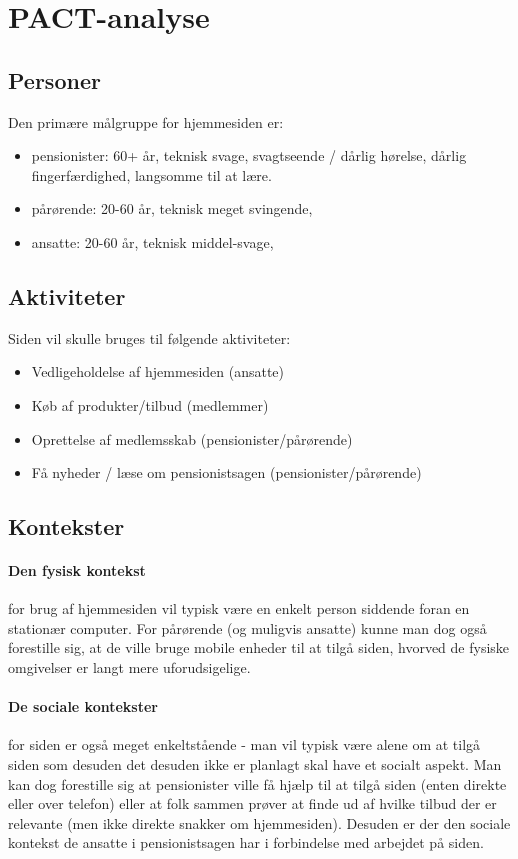 \section{PACT-analyse}

\subsection{Personer}
Den primære målgruppe for hjemmesiden er:
\begin{itemize}
\item pensionister: 60+ år, teknisk svage, svagtseende / dårlig hørelse, dårlig fingerfærdighed, langsomme til at lære.
\item pårørende: 20-60 år, teknisk meget svingende,
\item ansatte: 20-60 år, teknisk middel-svage,
\end{itemize}

\subsection{Aktiviteter}
Siden vil skulle bruges til følgende aktiviteter:
\begin{itemize}
\item Vedligeholdelse af hjemmesiden (ansatte)
\item Køb af produkter/tilbud (medlemmer)
\item Oprettelse af medlemsskab (pensionister/pårørende)
\item Få nyheder / læse om pensionistsagen (pensionister/pårørende)
\end{itemize}


\subsection{Kontekster}
\paragraph{Den fysisk kontekst} for brug af hjemmesiden vil typisk være en enkelt person
siddende foran en stationær computer. For pårørende (og muligvis ansatte) kunne
man dog også forestille sig, at de ville bruge mobile enheder til at tilgå
siden, hvorved de fysiske omgivelser er langt mere uforudsigelige.

\paragraph{De sociale kontekster} for siden er også meget enkeltstående -
man vil typisk være alene om at tilgå siden som desuden det desuden ikke er
planlagt skal have et socialt aspekt. Man kan dog forestille sig at pensionister
ville få hjælp til at tilgå siden (enten direkte eller over telefon) eller
at folk sammen prøver at finde ud af hvilke tilbud der er relevante (men
ikke direkte snakker om hjemmesiden). Desuden er der den sociale kontekst de
ansatte i pensionistsagen har i forbindelse med arbejdet på siden.


